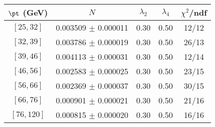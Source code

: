 \begin{tabular}{c||c|c|c|c}
$\pt$ (GeV) & $N$ & $\lambda_{2}$ & $\lambda_4$  & $\chi^2$/ndf  \\
\hline
$[25, 32]$ & 0.003509 $\pm$ 0.000011 & 0.30 & 0.50 & 12/12\\
$[32, 39]$ & 0.003786 $\pm$ 0.000019 & 0.30 & 0.50 & 26/13\\
$[39, 46]$ & 0.004113 $\pm$ 0.000031 & 0.30 & 0.50 & 12/14\\
$[46, 56]$ & 0.002583 $\pm$ 0.000025 & 0.30 & 0.50 & 23/15\\
$[56, 66]$ & 0.002369 $\pm$ 0.000037 & 0.30 & 0.50 & 30/15\\
$[66, 76]$ & 0.000901 $\pm$ 0.000021 & 0.30 & 0.50 & 21/16\\
$[76, 120]$ & 0.000815 $\pm$ 0.000020 & 0.30 & 0.50 & 16/16\\
\end{tabular}
